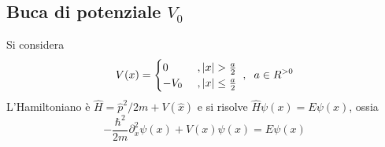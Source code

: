 \documentclass[10pt, a4paper]{scrartcl} %
\numberwithin{equation}{subsection}
\theoremstyle{style2}
\theoremstyle{style1}
\begin{document}
\subsection{Buca di potenziale $V_0$}

Si considera 
\[
V(x) = \begin{cases}
 0 & \ , \lvert x \rvert > \frac{a}{2}\\
-V_0 &\ , \lvert x \rvert \le \frac{a}{2}
\end{cases}\hspace{.1cm} , \hspace{.2cm} a \in R^{>0} 
\] 
L'Hamiltoniano \`e $\hat{H} = \hat{p}^2 / 2m + V(\hat{x})$ e si risolve $\hat{H}\psi (x) = E \psi (x)$, ossia
\begin{equation}
	-\frac{\hbar ^2}{2m} \partial _x^2 \psi (x) + V(x) \psi (x) = E\psi (x)
\end{equation}
\end{document}
